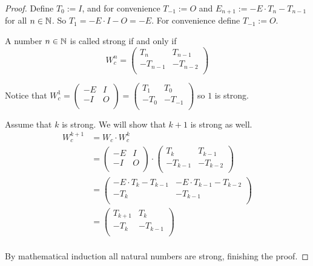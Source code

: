 \begin{proof}
  Define $T_{0} := I$, and for convenience $T_{-1} := O$ and
  $E_{n+1} := -E \cdot T_{n} - T_{n-1}$ for all $n\in\mathbb{N}$. So
  $T_{1} = -E \cdot I - O = -E$. For convenience define $T_{-1} := O$. 

  A number $n\in\mathbb{N}$ is called strong if and only if
  \[
  W_{c}^{n}
  =
  \left(
  \begin{array}{cc}
     T_{n} &  T_{n-1}  \\
    -T_{n-1} & -T_{n-2} \\
  \end{array}
  \right)
  \]

  Notice that
  $W_{c}^{1} = \left(\begin{smallmatrix} -E & I \\ -I & O \\\end{smallmatrix}\right) = \left(\begin{smallmatrix} T_{1} & T_{0} \\ -T_{0} & -T_{-1} \\\end{smallmatrix}\right)$
  so $1$ is strong.

  Assume that $k$ is strong. We will show that $k+1$ is strong as well.
  \[
  \begin{aligned}
  W_{c}^{k+1}
  & = W_{c} \cdot W_{c}^{k} \\
  & =
  \left(
  \begin{array}{cc}
    -E & I \\
    -I & O \\
  \end{array}
  \right)
  \cdot
  \left(
  \begin{array}{cc}
     T_{k} &  T_{k-1}  \\
    -T_{k-1} & -T_{k-2} \\
  \end{array}
  \right) \\
  & =
  \left(
  \begin{array}{cc}
    -E \cdot T_{k} - T_{k-1} & -E \cdot T_{k-1} - T_{k-2} \\
    -T_{k}                  & -T_{k-1}                  \\
  \end{array}
  \right) \\
  & =
  \left(
  \begin{array}{cc}
     T_{k+1} &  T_{k} \\
    -T_{k} & -T_{k-1} \\
  \end{array}
  \right) \\
  \end{aligned}
  \]

  By mathematical induction all natural numbers are strong, finishing the proof.
\end{proof}

